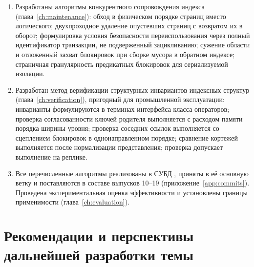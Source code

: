\begin{enumerate}
\item Разработаны алгоритмы конкурентного сопровождения индекса
(глава~\ref{ch:maintenance}): обход в физическом порядке страниц вместо
логического; двухпроходное удаление опустевших страниц с возвратом их в оборот;
формулировка условия безопасности переиспользования через полный
идентификатор транзакции, не подверженный зацикливанию; сужение области и
отложенный захват блокировок при сборке мусора в обратном индексе; страничная
гранулярность предикатных блокировок для сериализуемой изоляции.

\item Разработан метод верификации структурных инвариантов индексных структур
(глава~\ref{ch:verification}), пригодный для промышленной эксплуатации:
инварианты формулируются в терминах интерфейса класса операторов; проверка
согласованности ключей родителя выполняется с расходом памяти порядка ширины
уровня; проверка соседних ссылок выполняется со сцеплением блокировок в
однонаправленном порядке; сравнение кортежей выполняется после нормализации
представления; проверка допускает выполнение на реплике.

\item Все перечисленные алгоритмы реализованы в СУБД \pg{}, приняты в её
основную ветку и поставляются в составе выпусков 10--19
(приложение~\ref{app:commits}). Проведена экспериментальная оценка
эффективности и установлены границы применимости
(глава~\ref{ch:evaluation}).

\end{enumerate}

\section*{Рекомендации и перспективы дальнейшей разработки темы}

